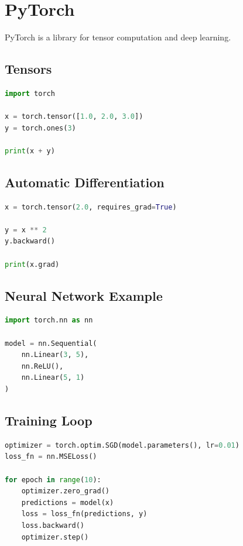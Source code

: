 \documentclass[12pt,oneside]{book}
\numberwithin{equation}{section}
\theoremstyle{definition}
\theoremstyle{plain}
\theoremstyle{remark}
\begin{document}
\section{PyTorch}

PyTorch is a library for tensor computation and deep learning.

\subsection{Tensors}

\begin{lstlisting}[language=Python]
import torch

x = torch.tensor([1.0, 2.0, 3.0])
y = torch.ones(3)

print(x + y)
\end{lstlisting}

\subsection{Automatic Differentiation}

\begin{lstlisting}[language=Python]
x = torch.tensor(2.0, requires_grad=True)

y = x ** 2
y.backward()

print(x.grad)
\end{lstlisting}

\subsection{Neural Network Example}

\begin{lstlisting}[language=Python]
import torch.nn as nn

model = nn.Sequential(
    nn.Linear(3, 5),
    nn.ReLU(),
    nn.Linear(5, 1)
)
\end{lstlisting}

\subsection{Training Loop}

\begin{lstlisting}[language=Python]
optimizer = torch.optim.SGD(model.parameters(), lr=0.01)
loss_fn = nn.MSELoss()

for epoch in range(10):
    optimizer.zero_grad()
    predictions = model(x)
    loss = loss_fn(predictions, y)
    loss.backward()
    optimizer.step()
\end{lstlisting}
\end{document}
